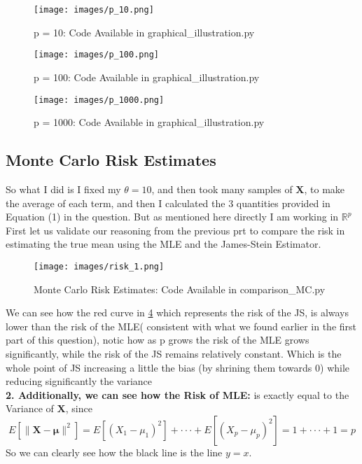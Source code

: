 \documentclass[12pt]{article}
\begin{document}
\begin{figure}[H]
  \centering 
  \texttt{[image: images/p\_10.png]}
  \caption{p = 10: Code Available in graphical\_illustration.py}
  \label{fig:p_10}
\end{figure}
\begin{figure}[H]
  \centering 
  \texttt{[image: images/p\_100.png]}
  \caption{p = 100: Code Available in graphical\_illustration.py}
  \label{fig:p_100}
\end{figure}
\begin{figure}[H]
  \centering 
  \texttt{[image: images/p\_1000.png]}
  \caption{p = 1000: Code Available in graphical\_illustration.py}
  \label{fig:p_1000}
\end{figure}

\subsection{Monte Carlo Risk Estimates}
So what I did is I fixed my $\theta = 10$, and then took many samples of $\boldsymbol{X}$, to make the average of each term, and then I calculated the 3 quantities provided in Equation (1) in the question. But as mentioned here directly I am working in $\mathbb{R}^p$ \\
First let us validate our reasoning from the previous prt to compare the risk in estimating the true mean using the MLE and the James-Stein Estimator. \\
\begin{figure}[H]
  \centering 
  \texttt{[image: images/risk\_1.png]}
  \caption{Monte Carlo Risk Estimates: Code Available in comparison\_MC.py}
  \label{fig:risk_1}
\end{figure}
We can see how the red curve in \ref{fig:risk_1} which represents the risk of the JS, is always lower than the risk of the MLE( consistent with what we found earlier in the first part of this question), notic how as p grows the risk of the MLE grows significantly, while the risk of the JS remains relatively constant. Which is the whole point of JS increasing a little the bias (by shrining them towards 0) while reducing significantly the variance\\
\textbf{2. Additionally, we can see how the Risk of MLE:} is exactly equal to the Variance of $\boldsymbol{X}$, since 
\[
E[\|\boldsymbol{X}-\boldsymbol{\mu}\|^2] = E[(X_1-\mu_1)^2] + \cdot \cdot \cdot + E[(X_p-\mu_p)^2] = 1 + \cdot \cdot \cdot + 1 = p
\]
So we can clearly see how the black line is the line $y = x$. \\
\end{document}
